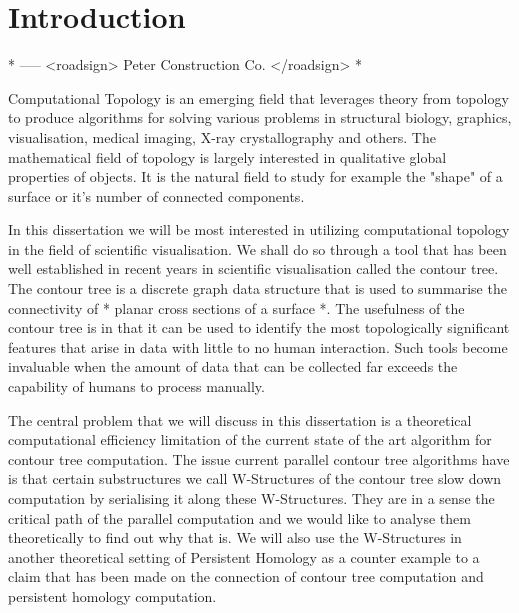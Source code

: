 \chapter{Introduction}
\label{chapter1}

* ----- <roadsign> Peter Construction Co. </roadsign> *


Computational Topology is an emerging field that leverages theory from topology to produce algorithms for solving various problems in structural biology, graphics, visualisation, medical imaging, X-ray crystallography and others. The mathematical field of topology is largely interested in qualitative global properties of objects. It is the natural field to study for example the "shape" of a surface or it's number of connected components.

In this dissertation we will be most interested in utilizing computational topology in the field of scientific visualisation. We shall do so through a tool that has been well established in recent years in scientific visualisation called the contour tree. The contour tree is a discrete graph data structure that is used to summarise the connectivity of * planar cross sections of a surface *. The usefulness of the contour tree is in that it can be used to identify the most topologically significant features that arise in data with little to no human interaction. Such tools become invaluable when the amount of data that can be collected far exceeds the capability of humans to process manually.

The central problem that we will discuss in this dissertation is a theoretical computational efficiency limitation of the current state of the art algorithm for contour tree computation. The issue current parallel contour tree algorithms have is that certain substructures we call W-Structures of the contour tree slow down computation by serialising it along these W-Structures. They are in a sense the critical path of the parallel computation and we would like to analyse them theoretically to find out why that is. We will also use the W-Structures in another theoretical setting of Persistent Homology as a counter example to a claim that has been made on the connection of contour tree computation and persistent homology computation.

